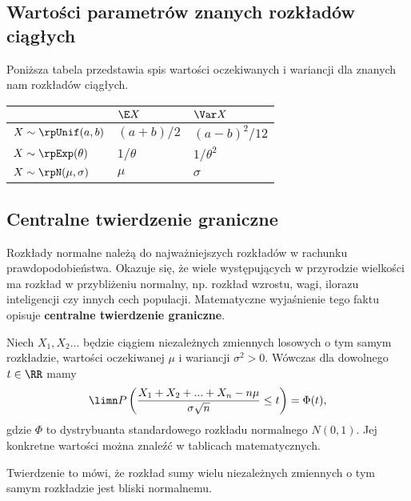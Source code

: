 \subsection{Wartości parametrów znanych rozkładów ciągłych}

Poniższa tabela przedstawia spis wartości oczekiwanych i wariancji dla znanych nam rozkładów ciągłych.

\begin{center}
\renewcommand{\arraystretch}{1.5}
\begin{tabular}{ C | C | C }
    & $\E X$ & $\Var X$ \\ \hline
    $X \sim \rpUnif(a, b)$ & $(a + b)/2$ & $(a - b)^2 / 12$ \\ \hline
    $X \sim \rpExp(\theta)$ & $1/\theta$ & $1/\theta^2$ \\ \hline
    $X \sim \rpN(\mu, \sigma)$ & $\mu$ & $\sigma$
\end{tabular}
\end{center}

\subsection{Centralne twierdzenie graniczne}

Rozkłady normalne należą do najważniejszych rozkładów w rachunku prawdopodobieństwa. Okazuje się, że wiele występujących w przyrodzie wielkości ma rozkład w przybliżeniu normalny, np. rozkład wzrostu, wagi, ilorazu inteligencji czy innych cech populacji. Matematyczne wyjaśnienie tego faktu opisuje \textbf{centralne twierdzenie graniczne}.
\bigskip

Niech $X_1, X_2 ...$ będzie ciągiem niezależnych zmiennych losowych o tym samym rozkładzie, wartości oczekiwanej $\mu$ i wariancji $\sigma^2 > 0$. Wówczas dla dowolnego $t \in \RR$ mamy
$$
\limn P\left(\frac{X_1 + X_2 + ... + X_n - n \mu}{\sigma \sqrt{n}} \leq t\right) = \Phi(t),
$$
gdzie $\Phi$ to dystrybuanta standardowego rozkładu normalnego $N(0,1)$. Jej konkretne wartości można znaleźć w tablicach matematycznych.

Twierdzenie to mówi, że rozkład sumy wielu niezależnych zmiennych o tym samym rozkładzie jest bliski normalnemu.

